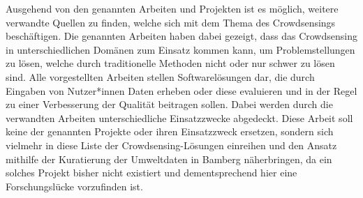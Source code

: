 Ausgehend von den genannten Arbeiten und Projekten ist es möglich, weitere verwandte Quellen zu finden, welche sich mit dem Thema des Crowdsensings beschäftigen. Die genannten Arbeiten haben dabei gezeigt, dass das Crowdsensing in unterschiedlichen Domänen zum Einsatz kommen kann, um Problemstellungen zu lösen, welche durch traditionelle Methoden nicht oder nur schwer zu lösen sind. Alle vorgestellten Arbeiten stellen Softwarelösungen dar, die durch Eingaben von Nutzer*innen Daten erheben oder diese evaluieren und in der Regel zu einer Verbesserung der Qualität beitragen sollen. Dabei werden durch die verwandten Arbeiten unterschiedliche Einsatzzwecke abgedeckt. Diese Arbeit soll keine der genannten Projekte oder ihren Einsatzzweck ersetzen, sondern sich vielmehr in diese Liste der Crowdsensing-Lösungen einreihen und den Ansatz mithilfe der Kuratierung der Umweltdaten in Bamberg näherbringen, da ein solches Projekt bisher nicht existiert und dementsprechend hier eine Forschungslücke vorzufinden ist.